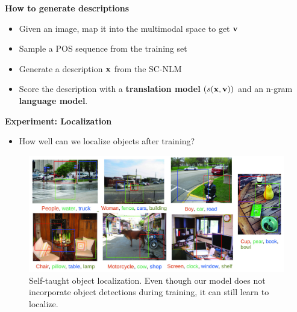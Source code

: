 \documentclass[serif,mathserif,final]{beamer}
\begin{document}
\begin{frame}{}
\begin{columns}[t]
\begin{column}{0.32\linewidth}
\begin{block}{\bf{\large How to generate descriptions}} 
  \begin{itemize}
  \item Given an image, map it into the multimodal space to get ${\bf v}$
  \item Sample a POS sequence from the training set
  \item Generate a description ${\bf x}$ from the SC-NLM
  \item Score the description with a \textbf{translation model} $(s({\bf x}, {\bf v}))$ and an n-gram \textbf{language model}.
  \end{itemize}
\end{block}
\vfill

\begin{block}{\bf{\large Experiment: Localization}}  
  \begin{itemize}
  \item How well can we localize objects after training?
  \end{itemize}
  \begin{figure}
    \centering
    \includegraphics[width=0.9\columnwidth]{align} 
    \caption{Self-taught object localization. Even though our model does not
      incorporate object detections during training, it can still learn to
      localize.}
    \label{fig:local}
  \end{figure}
\end{block}
\vfill   


\end{column}
\end{columns}
\end{frame}
\end{document}
